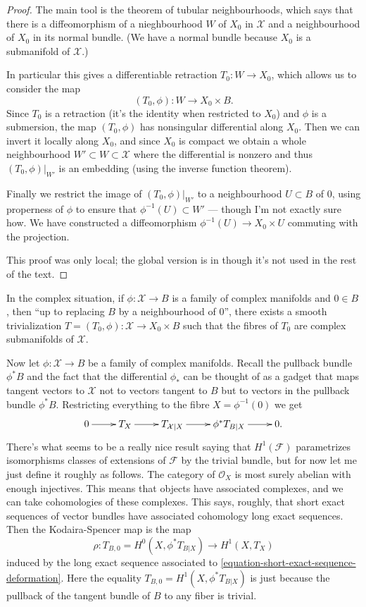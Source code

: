 \begin{proof}
The main tool is the theorem of tubular neighbourhoods,
which says that there is a diffeomorphism of
a nieghbourhood $W$ of $X_0$ in $\mathcal{X}$
and a neighbourhood of $X_0$ in its normal bundle.
(We have a normal bundle because $X_0$ is a submanifold of $\mathcal{X}$.)

In particular this gives a differentiable retraction
$T_0:W \to X_0$, which allows us to consider the map
$$
(T_0,\phi):W \to X_0 \times B.
$$
Since $T_0$ is a retraction 
(it's the identity when restricted to $X_0$) and $\phi$ is a submersion,
the map $(T_0,\phi)$ has nonsingular differential along $X_0$.
Then we can invert it locally along $X_0$,
and since $X_0$ is compact we obtain a whole
neighbourhood $W'\subset W \subset \mathcal{X}$ 
where the differential is nonzero and thus
$(T_0,\phi)|_{W'}$ is an embedding
(using the inverse function theorem).

Finally we restrict the image of $(T_0,\phi)|_{W'}$ 
to a neighbourhood $U\subset B$ of $0$,
using properness of $\phi$ to ensure
that $\phi^{-1}(U) \subset W'$ --- though I'm
not exactly sure how.
We have constructed a diffeomorphism
$\phi^{-1}(U) \to X_0 \times U$ 
commuting with the projection.

This proof was only local; the global version
is in \cite{Voisin} though it's not used in the rest of the text.
\end{proof}

In the complex situation, if $\phi:\mathcal{X} \to B$ is a family
of complex manifolds and $0 \in B$, then
``up to replacing $B$ by a neighbourhood of 0'',
there exists a smooth trivialization $T=(T_0,\phi):\mathcal{X} \to X_0 \times B$ 
such that the fibres of $T_0$ are complex submanifolds of $\mathcal{X}$.

Now let $\phi:\mathcal{X} \to B$ be a family of complex manifolds.
Recall the pullback bundle $\phi^*B$ and the fact
that the differential $\phi_*$ can be thought of as a gadget
that maps tangent vectors to $\mathcal{X}$ 
not to vectors tangent to $B$ but
to vectors in the pullback bundle $\phi^*B$.
Restricting everything to the fibre $X=\phi^{-1}(0)$ we get
\begin{equation}
\label{equation-short-exact-sequence-deformation}
\xymatrix{
0\ar[r]&T_X\ar[r]&T_{\mathcal{X}|X}\ar[r]&\phi^*T_{B|X}\ar[r]&0.
}
\end{equation}
There's what seems to be a really nice result saying that
$H^1(\mathcal{F})$ parametrizes isomorphisms classes
of extensions of $\mathcal{F}$ by the trivial bundle,
but for now let me just define it roughly as follows.
The category of $\mathcal{O}_X$ is most surely abelian
with enough injectives. This means that objects
have associated complexes, and we can take
cohomologies of these complexes.
This says, roughly, that short exact
sequences of vector bundles have associated cohomology
long exact sequences. Then the Kodaira-Spencer map
is the map 
$$
\rho:T_{B,0}=H^0(X,\phi^* T_{B|X})\to H^1(X,T_X)
$$
induced by the long exact sequence associated to
\ref{equation-short-exact-sequence-deformation}.
Here the equality $T_{B,0}=H^1(X,\phi^* T_{B|X})$ 
is just because the pullback of the tangent bundle of $B$ 
to any fiber is trivial.

